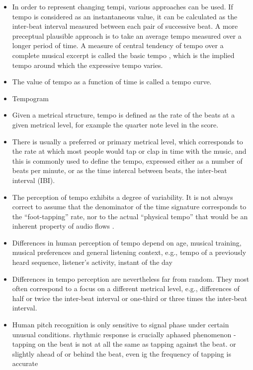 \documentclass{scrartcl}
\begin{document}
\begin{itemize}
\item In order to represent changing tempi, various approaches can be used. If tempo is considered as an instantaneous value, it can be calculated as the inter-beat interval measured between each pair of successive beat. A more preceptual plausible approach is to take an average tempo measured over a longer period of time. A measure of central tendency of tempo over a complete musical excerpt is called the basic tempo \cite{Repp1994}, which is the implied tempo around which the expressive tempo varies.
\item The value of tempo as a function of time is called a tempo curve.
\item Tempogram \cite{Cemgil2000}
\item Given a metrical structure, tempo is defined as the rate of the beats at a given metrical level, for example the quarter note level in the score. 
\item There is usually a preferred or primary metrical level, which corresponds to the rate at which most people would tap or clap in time with the music, and this is commonly used to define the tempo, expressed either as a number of beats per minute, or as the time intercal between beats, the inter-beat interval (IBI).
\item The perception of tempo exhibits a degree of variability. It is not always correct to assume that the denominator of the time signature corresponds to the ``foot-tapping'' rate, nor to the actual ``physical tempo'' that would be an inherent property of audio flows \cite{Drake1999}.
\item Differences in human perception of tempo depend on age, musical training, musical preferences and general listening context, e.g., tempo of a previously heard sequence, listener's activity, instant of the day \cite{Drake1993,Drake2000,Drake2000b}
\item Differences in tempo perception are nevertheless far from random. They most often correspond to a focus on a different metrical level, e.g., differences of half or twice the inter-beat interval or one-third or three times the inter-beat interval. 
\item Human pitch recognition is only sensitive to signal phase under certain unusual conditions. rhythmic response is crucially aphased phenomenon - tapping on the beat is not at all the same as tapping against the beat. or slightly ahead of or behind the beat, even ig the frequency of tapping is accurate \cite{Scheirer1998}

\end{itemize}
\end{document}
